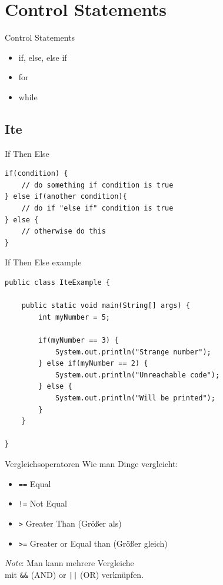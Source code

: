 \section{Control Statements}
\begin{frame}{Control Statements}
	
	\begin{itemize}
		\item if, else, else if
		\item for
		\item while
	\end{itemize}
		
\end{frame}



\subsection{Ite}
\begin{frame}[fragile]{{\huge I}f {\huge T}hen {\huge E}lse}
\begin{lstlisting}
if(condition) {
	// do something if condition is true
} else if(another condition){
	// do if "else if" condition is true 
} else {
	// otherwise do this
}
\end{lstlisting}
\end{frame}

\begin{frame}[fragile]{{\huge I}f {\huge T}hen {\huge E}lse example}
\begin{lstlisting}
public class IteExample {

	public static void main(String[] args) {
		int myNumber = 5;
		
		if(myNumber == 3) {
			System.out.println("Strange number");
		} else if(myNumber == 2) {
			System.out.println("Unreachable code");
		} else {
			System.out.println("Will be printed");
		}
	}
    
}
\end{lstlisting}
\end{frame}

\begin{frame}{Vergleichsoperatoren}
Wie man Dinge vergleicht:
\begin{itemize}
    \item \texttt{==} Equal
    \item \texttt{!=} Not Equal
    \item \texttt{>} Greater Than (Größer als)
    \item \texttt{>=} Greater or Equal than (Größer gleich)
\end{itemize}
\textit{Note}: Man kann mehrere Vergleiche\\ mit \texttt{\&\&} (AND) or \texttt{||} (OR) verknüpfen.
\end{frame}

